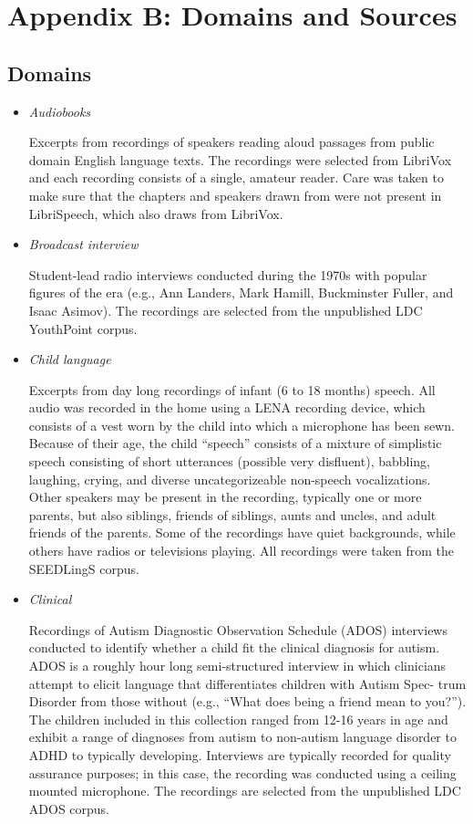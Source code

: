 \chapter{Appendix B: Domains and Sources}

\section{Domains}
\begin{itemize}
	\item \emph{Audiobooks}
	
	Excerpts from recordings of speakers reading aloud passages from public domain English language texts. The recordings were selected from LibriVox and each recording consists of a single, amateur reader. Care was taken to make sure that the chapters and speakers drawn from were not present in LibriSpeech, which also draws from LibriVox.
	
	\item \emph{Broadcast interview}
	
	Student-lead radio interviews conducted during the 1970s with popular figures of the era (e.g., Ann Landers, Mark Hamill, Buckminster Fuller, and Isaac Asimov). The recordings are selected from the unpublished LDC YouthPoint corpus.
	
	\item \emph{Child language}
	
	Excerpts from day long recordings of infant (6 to 18 months) speech. All audio was recorded in the home using a LENA recording device, which consists of a vest worn by the child into which a microphone has been sewn. Because of their age, the child “speech” consists of a mixture of simplistic speech consisting of short utterances (possible very disfluent), babbling, laughing, crying, and diverse uncategorizeable non-speech vocalizations. Other speakers may be present in the recording, typically one or more parents, but also siblings, friends of siblings, aunts and uncles, and adult friends of the parents. Some of the recordings have quiet backgrounds, while others have radios or televisions playing. All recordings were taken from the SEEDLingS corpus.
	
	\item \emph{Clinical}
	
	Recordings of Autism Diagnostic Observation Schedule (ADOS) interviews conducted to identify whether a child fit the clinical diagnosis for autism. ADOS is a roughly hour long semi-structured interview in which clinicians attempt to elicit language that differentiates children with Autism Spec- trum Disorder from those without (e.g., “What does being a friend mean to you?”). The children included in this collection ranged from 12-16 years in age and exhibit a range of diagnoses from autism to non-autism language disorder to ADHD to typically developing. Interviews are typically recorded for quality assurance purposes; in this case, the recording was conducted using a ceiling mounted microphone. The recordings are selected from the unpublished LDC ADOS corpus.
	

\end{itemize}
